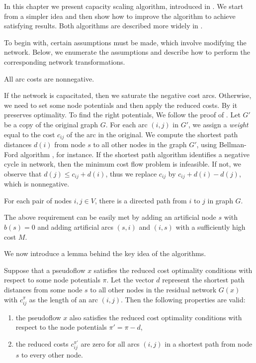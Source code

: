 In this chapter we present capacity scaling algorithm, introduced in \cite{edmonds1972}. We start from a simpler idea and then show how to improve the algorithm to achieve satisfying results.  Both algorithms are described more widely in \cite{ahuja1993network}. 

To begin with, certain assumptions must be made, which involve modifying the network. Below, we enumerate the assumptions and describe how to perform the corresponding network transformations.

\begin{assumption}\label{ass:cost_nonnegativity}
    All arc costs are nonnegative.
\end{assumption}
If the network is capacitated, then we saturate the negative cost arcs. Otherwise, we need to set some node potentials and then apply the reduced costs. By  it preserves optimality. To find the right potentials, We follow the proof of . Let $G'$ be a copy of the original graph $G$. For each arc $(i,j)$ in $G'$, we assign a \textit{weight} equal to the cost $c_{ij}$ of the arc in the original. We compute the shortest path distances $d(i)$ from node $s$ to all other nodes in the graph $G'$, using Bellman-Ford algorithm \cite{bellman1958routing}, for instance. If the shortest path algorithm identifies a negative cycle in network, then the minimum cost flow problem is infeasible. If not, we observe that $d(j) \leq c_{ij} + d(i)$, thus we replace $c_{ij}$ by $c_{ij}+ d(i) - d(j)$, which is nonnegative.

\begin{assumption}\label{ass:one_scc}

For each pair of nodes $i, j \in V$, there is a directed path from $i$ to $j$ in graph $G$.
\end{assumption}
The above requirement can be easily met by adding an artificial node $s$ with $b(s) = 0$ and adding artificial arcs $(s,i)$ and $(i,s)$ with a sufficiently high cost $M$.

We now introduce a lemma behind the key idea of the algorithms. 

\begin{lemma}
    \label{lem:edmonds_base_lemma}
    Suppose that a pseudoflow $x$ satisfies the reduced cost optimality conditions with respect to some node potentials $\pi$. Let the vector $d$ represent the shortest path distances from some node $s$ to all other nodes in the residual network $G(x)$ with $c_{ij}^\pi$ as the length of an arc $(i,j)$. Then the following properties are valid:
    \begin{enumerate}
        \item the pseudoflow $x$ also satisfies the reduced cost optimality conditions with respect to the node potentials $\pi' = \pi - d$,
        \item the reduced costs ${c_{ij}^{\pi'}}$ are zero for all arcs $(i,j)$ in a shortest path from node $s$ to every other node.
    \end{enumerate}
\end{lemma}

